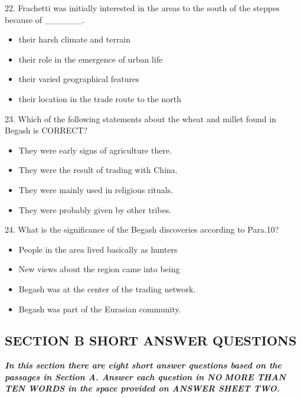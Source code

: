 \documentclass[UTF8,11pt]{ctexart}
\begin{document}
22. Frachetti was initially interested in the areas to the south of the steppes because of \_\_\_\_\_\_.


\begin{itemize}[leftmargin=2em,itemsep=.2em,topsep=.4em]\item[A.] their harsh climate and terrain
\item[B.] their role in the emergence of urban life
\item[C.] their varied geographical features
\item[D.] their location in the trade route to the north
\end{itemize}

23. Which of the following statements about the wheat and millet found in Begash is CORRECT?


\begin{itemize}[leftmargin=2em,itemsep=.2em,topsep=.4em]\item[A.] They were early signs of agriculture there.
\item[B.] They were the result of trading with China.
\item[C.] They were mainly used in religious rituals.
\item[D.] They were probably given by other tribes.
\end{itemize}

24. What is the significance of the Begash discoveries according to Para.10?


\begin{itemize}[leftmargin=2em,itemsep=.2em,topsep=.4em]\item[A.] People in the area lived basically as hunters
\item[B.] New views about the region came into being
\item[C.] Begash was at the center of the trading network.
\item[D.] Begash was part of the Eurasian community.
\end{itemize}

\subsection*{\textbf{SECTION B SHORT ANSWER QUESTIONS}}


\textbf{\textit{In this section there are eight short answer questions based on the passages in Section A. Answer each question in NO}} \textbf{\textit{MORE THAN TEN WORDS in the space provided on ANSWER SHEET TWO.}}
\end{document}
